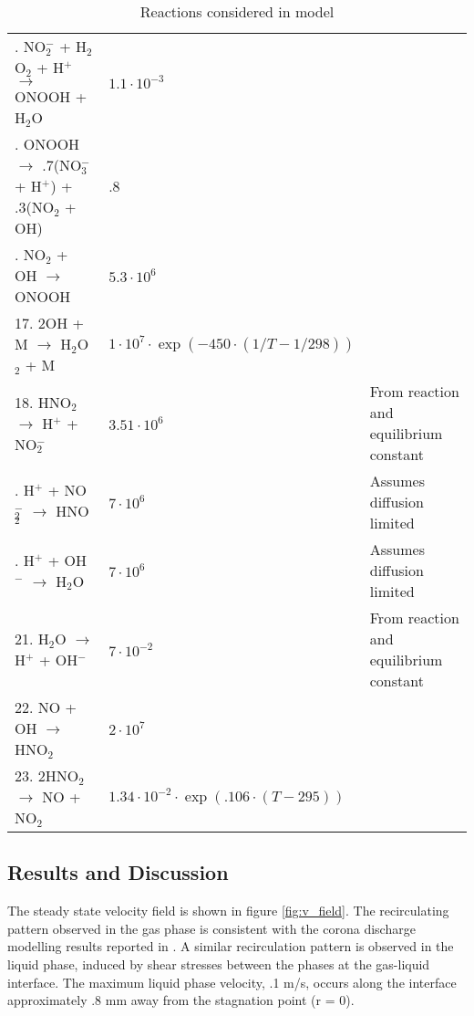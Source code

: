 \begin{table}[htpb]
\begin{center}
\begin{tabular}{l |p{6cm} |p{3cm}}
            \ONOOHlong{}. NO$_2^-$ + H$_2$O$_2$ + H$^+$ $\rightarrow$ ONOOH + H$_2$O & $1.1\cdot10^{-3}$ & \cite{Lukes2014b}\\
            \OHfromONOOH{}. ONOOH $\rightarrow$ .7(NO$_3^-$ + H$^+$) + .3(NO$_2$ + OH) & .8 & \cite{coddington1999hydroxyl}\\
            \ONOOHshort{}. NO$_2$ + OH $\rightarrow$ ONOOH & $5.3\cdot10^{6}$ & \cite{Lukes2014b,goldstein2005chemistry}\\
            17. 2OH + M $\rightarrow$ H$_2$O$_2$ + M & $1\cdot10^{7}\cdot\exp(-450\cdot(1/T-1/298))$ & \cite{johnaelliot1990estimation}\\
            18. HNO$_2$ $\rightarrow$ H$^+$ + NO$_2^-$ & $3.51\cdot10^{6}$ & From reaction \NitrousAcidAssociation{} and equilibrium constant \\
            \NitrousAcidAssociation{}. H$^+$ + NO$_2^-$ $\rightarrow$ HNO$_2$ & $7\cdot10^{6}$ & Assumes diffusion limited\\
            \WaterAssociation{}. H$^+$ + OH$^-$ $\rightarrow$ H$_2$O & $7\cdot10^{6}$ & Assumes diffusion limited \\
            21. H$_2$O $\rightarrow$ H$^+$ + OH$^-$ & $7\cdot10^{-2}$ & From reaction \WaterAssociation{} and equilibrium constant\\
            22. NO + OH $\rightarrow$ HNO$_2$ & $2\cdot10^{7}$ & \cite{Tian2014}\\
			23. 2HNO$_2$ $\rightarrow$ NO + NO$_2$ & $1.34\cdot10^{-2}\cdot\exp(.106\cdot(T-295))$ & \cite{park1988solubility}
        \end{tabular}
    \end{center}
    \caption{Reactions considered in model}
    \label{tab:rxns}
\end{table}

\subsection{Results and Discussion}

The steady state velocity field is shown in figure \ref{fig:v_field}. The recirculating pattern observed in the gas phase is consistent with the corona discharge modelling results reported in \cite{Zhao2005a}. A similar recirculation pattern is observed in the liquid phase, induced by shear stresses between the phases at the gas-liquid interface. The maximum liquid phase velocity, .1 m/s, occurs along the interface approximately .8 mm away from the stagnation point (r = 0).

